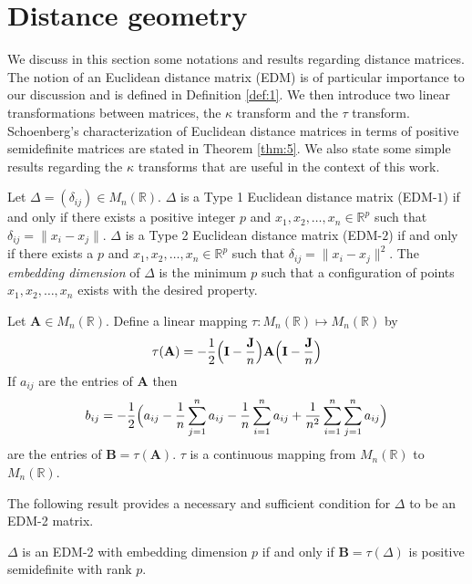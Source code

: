 \section{Distance geometry}
\label{sec:distance-geometry}
We discuss in this section some notations and results regarding
distance matrices. The notion of an Euclidean distance matrix (EDM) is
of particular importance to our discussion and is defined in
Definition \ref{def:1}. We then introduce two linear transformations
between matrices, the $\kappa$ transform and the $\tau$ transform.
Schoenberg's characterization
\citep{schoenberg35:_remar_mauric_frech_artic_sur} of Euclidean
distance matrices in terms of positive semidefinite matrices are
stated in Theorem \ref{thm:5}. We also state some simple results
regarding the $\kappa$ transforms that are useful in the context of
this work.

\begin{definition}
  \label{def:10}
  Let $\Delta = (\delta_{ij}) \in M_n(\mathbb{R})$. $\Delta$ is a Type 1
  Euclidean distance matrix (EDM-$1$) if and only if there exists a
  positive integer $p$ and $x_1, x_2, \dots, x_n \in \mathbb{R}^{p}$
  such that $\delta_{ij} = \| x_i - x_j \|$. $\Delta$ is a Type 2
  Euclidean distance matrix (EDM-$2$) if and only if there exists a
  $p$ and $x_1, x_2, \dots, x_n \in \mathbb{R}^{p}$ such that
  $\delta_{ij} = \|x_i - x_j\|^{2}$. The {\em embedding dimension} of
  $\Delta$ is the minimum $p$ such that a configuration of points
  $x_1, x_2, \dots, x_n$ exists with the desired property.
\end{definition}

\begin{definition}
  \label{def:11}
  Let $\mathbf{A} \in M_n(\mathbb{R})$. Define a linear mapping $\tau \colon M_n(\mathbb{R})
  \mapsto M_n(\mathbb{R})$ by
  \begin{equation}
    \label{eq:83}
    \tau(\mathbf{A}) = - \frac{1}{2} \Bigl(\mathbf{I} -
    \frac{\mathbf{J}}{n}\Bigr)\mathbf{A} \Bigl(\mathbf{I} - \frac{\mathbf{J}}{n}\Bigr)
  \end{equation}
  If $a_{ij}$ are the entries of $\mathbf{A}$ then
  \begin{equation}
    \label{eq:56}
    b_{ij} = -\frac{1}{2}\Bigl(a_{ij} - \frac{1}{n}\sum_{j=1}^{n}a_{ij} -
    \frac{1}{n}\sum_{i=1}^{n}{a_{ij}} +
      \frac{1}{n^2}\sum_{i=1}^{n}\sum_{j=1}^{n}a_{ij}\Bigr)
  \end{equation}
  are the entries of $\mathbf{B} = \tau(\mathbf{A})$. $\tau$
  is a continuous mapping from $M_n(\mathbb{R})$ to
  $M_n(\mathbb{R})$. 
\end{definition}
%
The following result provides a necessary and sufficient condition for
$\Delta$ to be an EDM-2 matrix.
\begin{theorem}
  \label{thm:5}
  $\Delta$ is an EDM-2 with embedding dimension $p$ if and only
  if $\mathbf{B} = \tau(\Delta)$ is positive semidefinite with rank
  $p$. 
\end{theorem}

